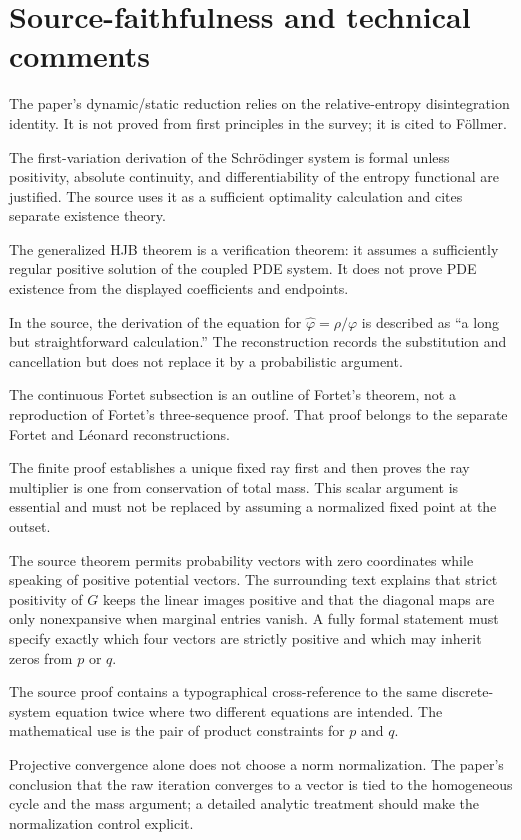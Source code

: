 \section{Source-faithfulness and technical comments}
\begin{commentarynotes}
\item The paper's dynamic/static reduction relies on the relative-entropy disintegration identity.
It is not proved from first principles in the survey; it is cited to F\"ollmer.
\item The first-variation derivation of the Schr\"odinger system is formal unless positivity,
absolute continuity, and differentiability of the entropy functional are justified.  The source uses
it as a sufficient optimality calculation and cites separate existence theory.
\item The generalized HJB theorem is a verification theorem: it assumes a sufficiently regular
positive solution of the coupled PDE system.  It does not prove PDE existence from the displayed
coefficients and endpoints.
\item In the source, the derivation of the equation for $\widehat\varphi=\rho/\varphi$ is described as
``a long but straightforward calculation.''  The reconstruction records the substitution and
cancellation but does not replace it by a probabilistic argument.
\item The continuous Fortet subsection is an outline of Fortet's theorem, not a reproduction of
Fortet's three-sequence proof.  That proof belongs to the separate Fortet and L\'eonard
reconstructions.
\item The finite proof establishes a unique fixed ray first and then proves the ray multiplier is one
from conservation of total mass.  This scalar argument is essential and must not be replaced by
assuming a normalized fixed point at the outset.
\item The source theorem permits probability vectors with zero coordinates while speaking of
positive potential vectors.  The surrounding text explains that strict positivity of $G$ keeps the
linear images positive and that the diagonal maps are only nonexpansive when marginal entries
vanish.  A fully formal statement must specify exactly which four vectors are strictly positive and
which may inherit zeros from $p$ or $q$.
\item The source proof contains a typographical cross-reference to the same discrete-system equation
twice where two different equations are intended.  The mathematical use is the pair of product
constraints for $p$ and $q$.
\item Projective convergence alone does not choose a norm normalization.  The paper's conclusion
that the raw iteration converges to a vector is tied to the homogeneous cycle and the mass argument;
a detailed analytic treatment should make the normalization control explicit.
\end{commentarynotes}

